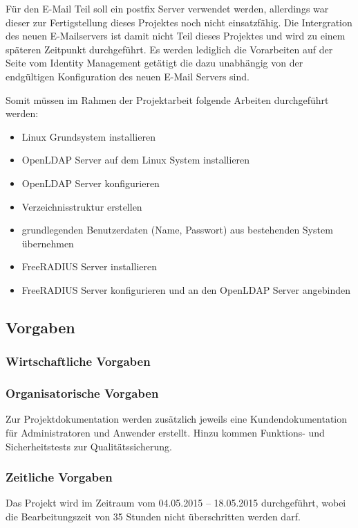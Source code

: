 \documentclass[11pt,a4paper,titlepage=firstiscover]{scrartcl} %
\begin{document}
F\"ur den E-Mail Teil soll ein postfix Server verwendet werden, allerdings war dieser zur Fertigstellung dieses Projektes noch nicht einsatzf\"ahig. Die Intergration des neuen E-Mailservers ist damit nicht Teil dieses Projektes und wird zu einem sp\"ateren Zeitpunkt durchgef\"uhrt. Es werden lediglich die Vorarbeiten auf der Seite vom Identity Management get\"atigt die dazu unabh\"angig von der endg\"ultigen Konfiguration des neuen E-Mail Servers sind.\newline

\noindent
Somit m\"ussen im Rahmen der Projektarbeit folgende Arbeiten durchgef\"uhrt werden: 
\begin{itemize}
\item Linux Grundsystem installieren
\item OpenLDAP Server auf dem Linux System installieren
\item OpenLDAP Server konfigurieren
\item Verzeichnisstruktur erstellen
\item grundlegenden Benutzerdaten (Name, Passwort) aus bestehenden System \"ubernehmen
\item FreeRADIUS Server installieren
\item FreeRADIUS Server konfigurieren und an den OpenLDAP Server angebinden
\end{itemize}


\subsection{Vorgaben}
\subsubsection{Wirtschaftliche Vorgaben}
\subsubsection{Organisatorische Vorgaben}
Zur Projektdokumentation werden zus\"atzlich jeweils eine Kundendokumentation für Administratoren und Anwender erstellt. Hinzu kommen Funktions- und Sicherheitstests zur Qualit\"atssicherung.


\subsubsection{Zeitliche Vorgaben}
Das Projekt wird im Zeitraum vom 04.05.2015 – 18.05.2015 durchgef\"uhrt, wobei die Bearbeitungszeit von 35 Stunden nicht \"uberschritten werden darf.
\end{document}
